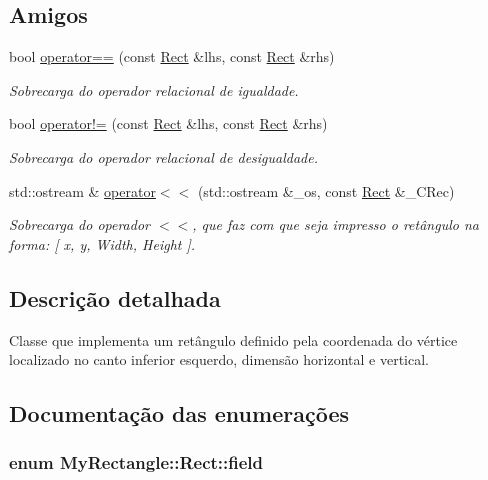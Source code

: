 \subsection*{Amigos}
\begin{DoxyCompactItemize}
\item 
bool \hyperlink{classMyRectangle_1_1Rect_a1c50eac413c2c3f791ca83c9470e65d0}{operator==} (const \hyperlink{classMyRectangle_1_1Rect}{Rect} \&lhs, const \hyperlink{classMyRectangle_1_1Rect}{Rect} \&rhs)
\begin{DoxyCompactList}\small\item\em Sobrecarga do operador relacional de igualdade. \end{DoxyCompactList}\item 
bool \hyperlink{classMyRectangle_1_1Rect_a83e9a2733ef5bda5b67713c5661489f2}{operator!=} (const \hyperlink{classMyRectangle_1_1Rect}{Rect} \&lhs, const \hyperlink{classMyRectangle_1_1Rect}{Rect} \&rhs)
\begin{DoxyCompactList}\small\item\em Sobrecarga do operador relacional de desigualdade. \end{DoxyCompactList}\item 
std\+::ostream \& \hyperlink{classMyRectangle_1_1Rect_a2ec7afc82beae7cecb72a829b22e4054}{operator$<$$<$} (std\+::ostream \&\+\_\+os, const \hyperlink{classMyRectangle_1_1Rect}{Rect} \&\+\_\+\+C\+Rec)
\begin{DoxyCompactList}\small\item\em Sobrecarga do operador $<$$<$, que faz com que seja impresso o ret\^{a}ngulo na forma\+: \mbox{[} x, y, Width, Height \mbox{]}. \end{DoxyCompactList}\end{DoxyCompactItemize}


\subsection{Descrição detalhada}
Classe que implementa um ret\^{a}ngulo definido pela coordenada do v\'{e}rtice localizado no canto inferior esquerdo, dimens\~{a}o horizontal e vertical. 

\subsection{Documentação das enumerações}
\subsubsection[{\texorpdfstring{field}{field}}]{\setlength{\rightskip}{0pt plus 5cm}enum {\bf My\+Rectangle\+::\+Rect\+::field}}\hypertarget{classMyRectangle_1_1Rect_a78ae9cb320d9d52d1ec72a2649af0a65}{}\label{classMyRectangle_1_1Rect_a78ae9cb320d9d52d1ec72a2649af0a65}


